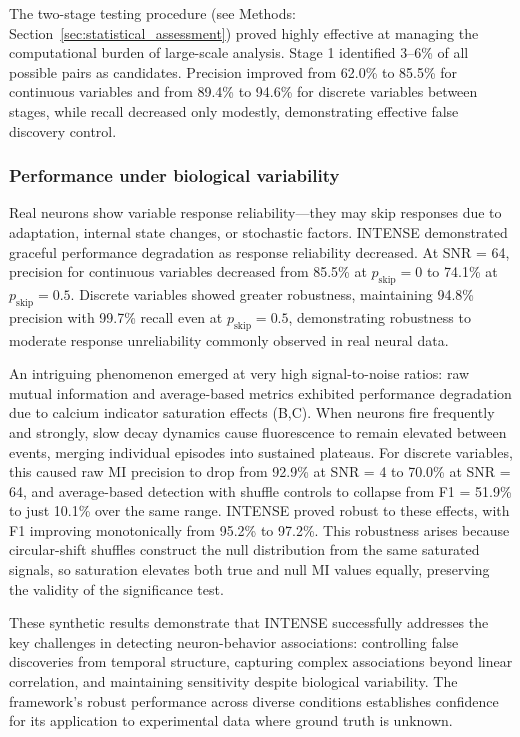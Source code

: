 The two-stage testing procedure (see Methods: Section~\ref{sec:statistical_assessment})
proved highly effective at managing the
computational burden of large-scale analysis. Stage 1 identified 3--6\%
of all possible pairs as candidates.
Precision improved from 62.0\% to 85.5\% for continuous variables and from 89.4\% to 94.6\%
for discrete variables between stages, while recall decreased only modestly, demonstrating
effective false discovery control.

\subsubsection{Performance under biological variability}
\label{sec:performance_variability}

Real neurons show variable response reliability---they may skip responses due to
adaptation, internal state changes, or stochastic factors. INTENSE demonstrated
graceful performance degradation as response reliability decreased. At SNR = 64,
precision for continuous variables decreased from 85.5\% at $p_{\text{skip}} = 0$ to
74.1\% at $p_{\text{skip}} = 0.5$. Discrete variables showed greater robustness,
maintaining 94.8\% precision with 99.7\% recall even at $p_{\text{skip}} = 0.5$,
demonstrating robustness to moderate response unreliability commonly observed in real neural data.

An intriguing phenomenon emerged at very high signal-to-noise ratios: raw mutual
information and average-based metrics exhibited performance degradation due to calcium
indicator saturation effects (B,C). When neurons fire frequently
and strongly, slow decay dynamics cause fluorescence to remain elevated between events,
merging individual episodes into sustained plateaus. For discrete variables, this caused
raw MI precision to drop from 92.9\% at SNR = 4 to 70.0\% at SNR = 64, and
average-based detection with shuffle controls to collapse from F1 = 51.9\% to just
10.1\% over the same range. INTENSE proved robust to these effects, with F1 improving
monotonically from 95.2\% to 97.2\%. This robustness arises because circular-shift
shuffles construct the null distribution from the same saturated signals, so saturation
elevates both true and null MI values equally, preserving the validity of the
significance test.

These synthetic results demonstrate that INTENSE successfully addresses the key
challenges in detecting neuron-behavior associations: controlling false discoveries
from temporal structure, capturing complex associations beyond linear correlation,
and maintaining sensitivity despite biological variability. The framework's robust
performance across diverse conditions establishes confidence for its application to experimental data where ground truth is unknown. 

